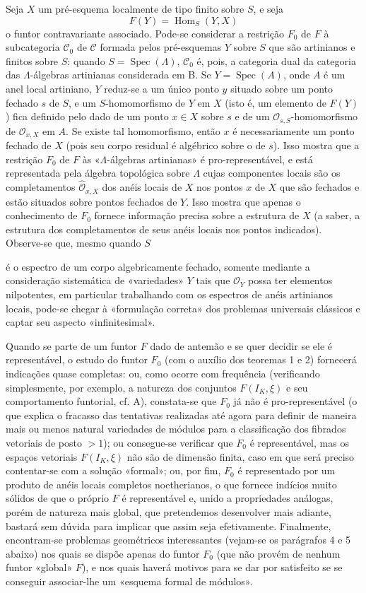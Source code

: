 \documentclass[11pt,twoside,openany]{book}
\numberwithin{equation}{section}
\newcommand{\src}[1]{%
  \phantomsection\hypertarget{src:#1}{}%
  \marginpar{\raggedleft\footnotesize\sffamily #1}%
}
\theoremstyle{plain}
\theoremstyle{definition}
\theoremstyle{remark}
\newcommand{\FgaUnitKey}{frontmatter}
\renewcommand{\src}[1]{%
  \phantomsection\hypertarget{src:\FgaUnitKey:#1}{}%
  \marginpar{\raggedleft\footnotesize\sffamily #1}%
}
\begin{document}
Seja $X$ um pré-esquema localmente de tipo finito sobre $S$, e seja
\[
  F(Y)=\operatorname{Hom}_S(Y,X)
\]
o funtor contravariante associado. Pode-se considerar a restrição $F_0$ de
$F$ à subcategoria $\mathcal C_0$ de $\mathcal C$ formada pelos
pré-esquemas $Y$ sobre $S$ que são artinianos e finitos sobre $S$: quando
$S=\operatorname{Spec}(\Lambda)$, $\mathcal C_0$ é, pois, a categoria dual
da categoria das $\Lambda$-álgebras artinianas considerada em B. Se
$Y=\operatorname{Spec}(A)$, onde $A$ é um anel local artiniano, $Y$
reduz-se a um único ponto $y$ situado sobre um ponto fechado $s$ de $S$, e um
$S$-homomorfismo de $Y$ em $X$ (isto é, um elemento de $F(Y)$) fica definido
pelo dado de um ponto $x\in X$ sobre $s$ e de um
$\mathcal O_{s,S}$-homomorfismo de $\mathcal O_{x,X}$ em $A$. Se existe tal
homomorfismo, então $x$ é necessariamente um ponto fechado de $X$ (pois seu
corpo residual é algébrico sobre o de $s$). Isso mostra que a restrição
$F_0$ de $F$ às «$\Lambda$-álgebras artinianas» é pro-representável, e está
representada pela álgebra topológica sobre $\Lambda$ cujas componentes
locais são os completamentos $\widehat{\mathcal O}_{x,X}$ dos anéis locais
de $X$ nos pontos $x$ de $X$ que são fechados e estão situados sobre pontos
fechados de $Y$. Isso mostra que apenas o conhecimento de $F_0$ fornece
informação precisa sobre a estrutura de $X$ (a saber, a estrutura dos
completamentos de seus anéis locais nos pontos indicados). Observe-se que,
mesmo quando $S$

\src{380}
é o espectro de um corpo algebricamente fechado, somente mediante a
consideração sistemática de «variedades» $Y$ tais que $\mathcal O_Y$ possa
ter elementos nilpotentes, em particular trabalhando com os espectros de
anéis artinianos locais, pode-se chegar à «formulação correta» dos
problemas universais clássicos e captar seu aspecto «infinitesimal».

Quando se parte de um funtor $F$ dado de antemão e se quer decidir se ele é
representável, o estudo do funtor $F_0$ (com o auxílio dos teoremas 1 e 2)
fornecerá indicações quase completas: ou, como ocorre com frequência
(verificando simplesmente, por exemplo, a natureza dos conjuntos
$F(I_K,\xi)$ e seu comportamento funtorial, cf. A), constata-se que $F_0$ já não
é pro-representável (o que explica o fracasso das tentativas realizadas
até agora para definir de maneira mais ou menos natural variedades de módulos
para a classificação dos fibrados vetoriais de posto $>1$); ou consegue-se
verificar que $F_0$ é representável, mas os espaços vetoriais
$F(I_K,\xi)$ não são de dimensão finita, caso em que será preciso contentar-se com
a solução «formal»; ou, por fim, $F_0$ é representado por um
produto de anéis locais completos noetherianos, o que fornece indícios muito
sólidos de que o próprio $F$ é representável e, unido a propriedades análogas,
porém de natureza mais global, que pretendemos desenvolver mais adiante, bastará
sem dúvida para implicar que assim seja efetivamente. Finalmente, encontram-se
problemas geométricos interessantes (vejam-se os parágrafos 4 e 5 abaixo) nos
quais se dispõe apenas do funtor $F_0$ (que não provém de nenhum funtor «global»
$F$), e nos quais haverá motivos para se dar por satisfeito se se conseguir associar-lhe
um «esquema formal de módulos».
\end{document}
